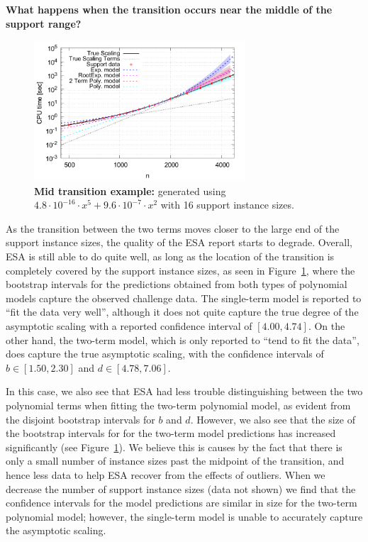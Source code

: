 \documentclass[aic]{iosart2x}
\begin{document}
\textbf{What happens when the transition occurs near the middle of the support range?}
\begin{figure}[t]
\centering
\includegraphics[width=0.7\textwidth]{fittedModels-2-5-15-16s.pdf}
\caption{\textbf{Mid transition example:} generated using $4.8\cdot 10^{-16} \cdot x^5 + 9.6\cdot 10^{-7} \cdot x^2$ with 16 support instance sizes.}
\label{fig:AA-competing-2-5-15-16s}
\end{figure}
As the transition between the two terms moves closer to the large end of the support instance sizes, the quality of the ESA report starts to degrade. Overall, ESA is still able to do quite well, as long as the location of the transition is completely covered by the support instance sizes, as seen in Figure~\ref{fig:AA-competing-2-5-15-16s}, where the bootstrap intervals for the predictions obtained from both types of polynomial models capture the observed challenge data. 
The single-term model is reported to ``fit the data very well'', although it does not quite capture the true degree of the asymptotic scaling with a reported confidence interval of $[4.00,4.74]$. 
On the other hand, the two-term model, which is only reported to ``tend to fit the data'', does capture the true asymptotic scaling, with the confidence intervals of $b \in [1.50,2.30]$ and $d \in [4.78,7.06]$. 

In this case, we also see that ESA had less trouble distinguishing between the two polynomial terms when fitting the two-term polynomial model, as evident from the disjoint bootstrap intervals for $b$ and $d$.
However, we also see that the size of the bootstrap intervals for for the two-term model predictions has increased significantly (see Figure~\ref{fig:AA-competing-2-5-15-16s}). 
We believe this is causes by the fact that there is only a small number of instance sizes past the midpoint of the transition, and hence less data to help ESA recover from the effects of outliers. 
When we decrease the number of support instance sizes (data not shown) we find that the confidence intervals for the model predictions are similar in size for the two-term polynomial model; however, the single-term model is unable to accurately capture the asymptotic scaling.
\end{document}
